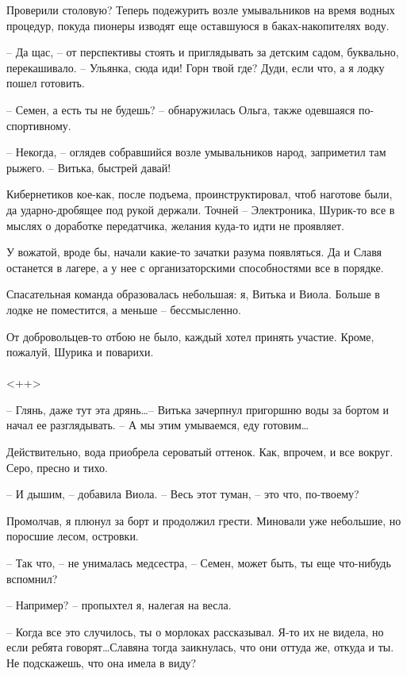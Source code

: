 \documentclass[a4paper]{book}
\begin{document}
Проверили столовую? Теперь подежурить возле умывальников на время водных процедур, покуда пионеры изводят еще оставшуюся в баках-накопителях воду.

-- Да щас, -- от перспективы стоять и приглядывать за детским садом, буквально, перекашивало. -- Ульянка, сюда иди! Горн твой где? Дуди, если что, а я лодку пошел готовить.

-- Семен, а есть ты не будешь? -- обнаружилась  Ольга, также одевшаяся по-спортивному.

-- Некогда, -- оглядев собравшийся возле умывальников народ, заприметил там рыжего. -- Витька, быстрей давай!

Кибернетиков кое-как, после подъема, проинструктировал, чтоб наготове были, да ударно-дробящее под рукой держали. Точней -- Электроника, Шурик-то все в мыслях о доработке передатчика, желания куда-то идти не проявляет. 

У вожатой, вроде бы, начали какие-то зачатки разума появляться. Да и Славя останется в лагере, а у нее с организаторскими способностями все в порядке.

Спасательная команда образовалась небольшая: я, Витька и Виола. Больше в лодке не поместится, а меньше -- бессмысленно. 

От добровольцев-то отбою не было, каждый хотел принять участие. Кроме, пожалуй, Шурика и поварихи.

\paragraph{}<++>

-- Глянь, даже тут эта дрянь\ldots -- Витька зачерпнул пригоршню воды за бортом и начал ее разглядывать. -- А мы этим умываемся, еду готовим\ldots 

Действительно, вода приобрела сероватый оттенок. Как, впрочем, и все вокруг. Серо, пресно и тихо.

-- И дышим, -- добавила Виола. -- Весь этот туман, -- это что, по-твоему? 

Промолчав, я плюнул за борт и продолжил грести. Миновали уже небольшие, но поросшие лесом, островки. 

-- Так что, -- не унималась медсестра, -- Семен, может быть, ты еще что-нибудь вспомнил? 

-- Например? -- пропыхтел я, налегая на весла.

-- Когда все это случилось, ты о морлоках рассказывал. Я-то их не видела, но если ребята говорят\ldots Славяна тогда заикнулась, что они оттуда же, откуда и ты. Не подскажешь, что она имела в виду?
\end{document}
